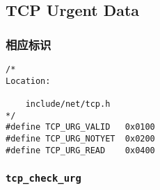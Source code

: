 	\subsection{TCP Urgent Data}
		\subsubsection{相应标识}
\begin{verbatim}
/*
Location:

	include/net/tcp.h
*/
#define TCP_URG_VALID	0x0100
#define TCP_URG_NOTYET	0x0200
#define TCP_URG_READ	0x0400
\end{verbatim}
		\subsubsection{\texttt{tcp_check_urg}}
			\label{TCPUrgent:tcp_check_urg}

